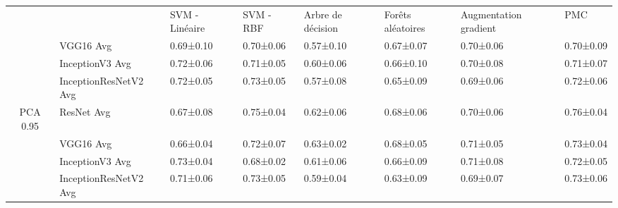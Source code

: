 \begin{landscape}
\begin{table}[]
\begin{tabular}{clllllll}
\multicolumn{1}{l}{}        &                                    & SVM - Linéaire                             & SVM - RBF                         & Arbre de décision                 & Forêts aléatoires                 & Augmentation gradient             & PMC                               \\
                            & VGG16 Avg                          & 0.69±0.10                                  & 0.70±0.06                         & 0.57±0.10                         & 0.67±0.07                         & 0.70±0.06                         & 0.70±0.09                         \\
                            & InceptionV3 Avg                    & 0.72±0.06                                  & 0.71±0.05                         & 0.60±0.06                         & 0.66±0.10                         & 0.70±0.08                         & 0.71±0.07                         \\
                            & InceptionResNetV2 Avg              & 0.72±0.05                                  & 0.73±0.05                         & 0.57±0.08                         & 0.65±0.09                         & 0.69±0.06                         & 0.72±0.06                         \\
\multirow{-4}{*}{PCA 0.95}  & ResNet Avg                         & 0.67±0.08                                  & 0.75±0.04                         & 0.62±0.06                         & 0.68±0.06                         & 0.70±0.06                         & 0.76±0.04                         \\
                            & VGG16 Avg                          & 0.66±0.04                                  & 0.72±0.07                         & 0.63±0.02                         & 0.68±0.05                         & 0.71±0.05                         & 0.73±0.04                         \\
                            & InceptionV3 Avg                    & 0.73±0.04                                  & 0.68±0.02                         & 0.61±0.06                         & 0.66±0.09                         & 0.71±0.08                         & 0.72±0.05                         \\
                            & InceptionResNetV2 Avg              & 0.71±0.06                                  & 0.73±0.05                         & 0.59±0.04                         & 0.63±0.09                         & 0.69±0.07                         & 0.73±0.06                         \\

\end{tabular}
\end{table}
\end{landscape}
